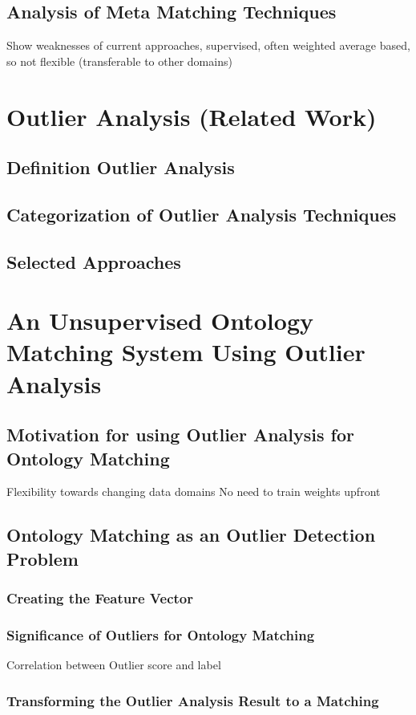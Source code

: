\documentclass[11pt,titlepage,oneside,openany,a4paper]{report}
\begin{document}
\clearpage


\section{Analysis of Meta Matching Techniques}
Show weaknesses of current approaches, supervised, often weighted average based, so not flexible (transferable to other domains)

\chapter{Outlier Analysis (Related Work)}
\section{Definition Outlier Analysis}
\section{Categorization of Outlier Analysis Techniques}
\section{Selected Approaches}


\chapter{An Unsupervised Ontology Matching System Using Outlier Analysis}
\section{Motivation for using Outlier Analysis for Ontology Matching}
Flexibility towards changing data domains
No need to train weights upfront
\section{Ontology Matching as an Outlier Detection Problem}
\subsection{Creating the Feature Vector}
\subsection{Significance of Outliers for Ontology Matching}
Correlation between Outlier score and label
\subsection{Transforming the Outlier Analysis Result to a Matching}
\end{document}
